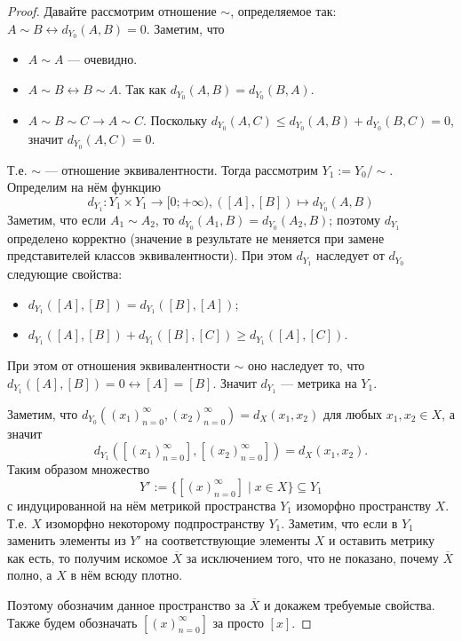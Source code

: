 \documentclass[12pt,a4paper]{article}
\begin{document}
\begin{proof}
        Давайте рассмотрим отношение $\sim$, определяемое так: $A \sim B \leftrightarrow d_{Y_0}(A, B) = 0$. Заметим, что
        \begin{itemize}
            \item $A \sim A$ --- очевидно.
            \item $A \sim B \leftrightarrow B \sim A$. Так как $d_{Y_0}(A, B) = d_{Y_0}(B, A)$.
            \item $A \sim B \sim C \rightarrow A \sim C$. Поскольку $d_{Y_0}(A, C) \leqslant d_{Y_0}(A, B) + d_{Y_0}(B, C) = 0$, значит $d_{Y_0}(A, C) = 0$.
        \end{itemize}
        Т.е. $\sim$ --- отношение эквивалентности. Тогда рассмотрим $Y_1 := Y_0/\sim$. Определим на нём функцию
        \[d_{Y_1}: Y_1 \times Y_1 \to [0; + \infty), ([A], [B]) \mapsto d_{Y_0}(A, B)\]
        Заметим, что если $A_1 \sim A_2$, то $d_{Y_0}(A_1, B) = d_{Y_0}(A_2, B)$; поэтому $d_{Y_1}$ определено корректно (значение в результате не меняется при замене представителей классов эквивалентности). При этом $d_{Y_1}$ наследует от $d_{Y_0}$ следующие свойства:
        \begin{itemize}
            \item $d_{Y_1}([A], [B]) = d_{Y_1}([B], [A])$;
            \item $d_{Y_1}([A], [B]) + d_{Y_1}([B], [C]) \geqslant d_{Y_1}([A], [C])$.
        \end{itemize}
        При этом от отношения эквивалентности $\sim$ оно наследует то, что $d_{Y_1}([A], [B]) = 0 \leftrightarrow [A] = [B]$. Значит $d_{Y_1}$ --- метрика на $Y_1$.

        Заметим, что $d_{Y_0}((x_1)_{n=0}^\infty, (x_2)_{n=0}^\infty) = d_X(x_1, x_2)$ для любых $x_1, x_2 \in X$, а значит
        \[d_{Y_1}([(x_1)_{n=0}^\infty], [(x_2)_{n=0}^\infty]) = d_X(x_1, x_2).\]
        Таким образом множество
        \[Y' := \{[(x)_{n=0}^\infty] \mid x \in X\} \subseteq Y_1\]
        с индуцированной на нём метрикой пространства $Y_1$ изоморфно пространству $X$. Т.е. $X$ изоморфно некоторому подпространству $Y_1$. Заметим, что если в $Y_1$ заменить элементы из $Y'$ на соответствующие элементы $X$ и оставить метрику как есть, то получим искомое $\overline{X}$ за исключением того, что не показано, почему $\overline{X}$ полно, а $X$ в нём всюду плотно.
        
        Поэтому обозначим данное пространство за $\overline{X}$ и докажем требуемые свойства. Также будем обозначать $[(x)_{n=0}^\infty]$ за просто $[x]$.


\end{proof}
\end{document}
